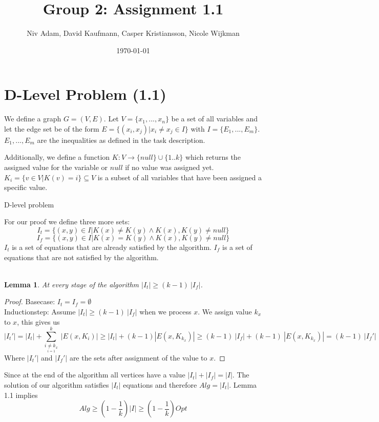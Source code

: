 \documentclass{article}
\title{Group 2: Assignment 1.1}
\author{Niv Adam, David Kaufmann, Casper Kristiansson, Nicole Wijkman}
\date{\today}
\newtheorem{lemma}[theorem]{Lemma}
\begin{document}
\maketitle

\section{D-Level Problem (1.1)}

We define a graph $G=(V,E)$. Let $V=\{x_1,...,x_n\}$ be a set of all variables and let the edge set be of the form $E=\{(x_i,x_j)|x_i\neq x_j\in I\}$ with $I=\{E_1,...,E_m\}$. $E_1,...,E_m$ are the inequalities as defined in the task description.

Additionally, we define a function $K:V\rightarrow \{null\} \cup \{1..k\}$ which returns the assigned value for the variable or $null$ if no value was assigned yet. $K_i=\{v \in V|K(v) = i\}\subseteq V$ is a subset of all variables that have been assigned a specific value.
\begin{algorithm}
\caption{D-level problem}
\DontPrintSemicolon
{}
\end{algorithm}

For our proof we define three more sets:
$$I_t=\{(x,y)\in I | K(x)\neq K(y) \land K(x), K(y) \neq null\}$$
$$I_f=\{(x,y)\in I | K(x)=K(y) \land K(x), K(y) \neq null\}$$
$I_t$ is a set of equations that are already satisfied by the algorithm. $I_f$ is a set of equations that are not satisfied by the algorithm. %
\\
\\
\begin{lemma}
At every stage of the algorithm $|I_t| \geq (k-1) \: |I_f|$.
\end{lemma}

\begin{proof}
Basecase: $I_t = I_f = \emptyset$
\\
Inductionstep: Assume $|I_t| \geq (k-1) \: |I_f|$ when we process $x$.
We assign value $k_x$ to $x$, this gives us
$$|I_t'|=|I_t|+\sum\limits_{\underset{i=1}{i \neq k_x}}^{k} \: |E(x,K_i)| 
\geq |I_t|+(k-1)|E(x,K_{k_x})| \geq (k-1) \: |I_f| + (k-1) \: |E(x,K_{k_x})| = (k-1) \:|I_f'|$$
Where $|I_t'|$ and $|I_f'|$ are the sets after assignment of the value to $x$.
\end{proof}
Since at the end of the algorithm all vertices have a value $|I_t|+|I_f|=|I|$. The solution of our algorithm satisfies $|I_t|$ equations and therefore $Alg=|I_t|$. Lemma 1.1 implies $$Alg \geq (1-\frac{1}{k})|I| \geq (1-\frac{1}{k}) Opt$$




\end{document}
